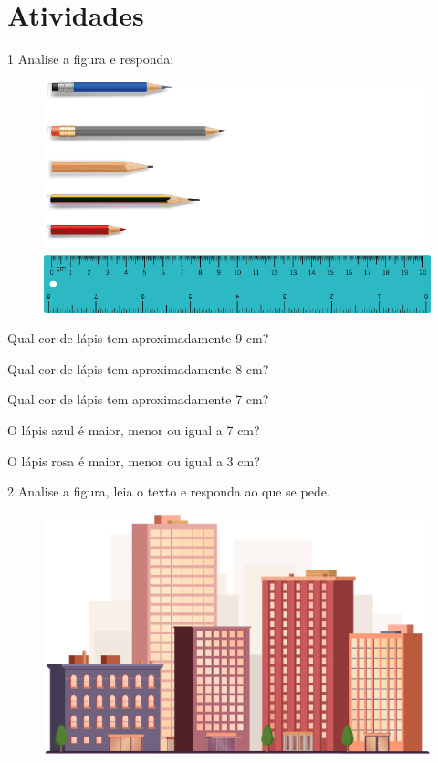 \pagebreak
\section*{Atividades}

\num{1} Analise a figura e responda:

\begin{figure}[htpb!]
\includegraphics[width=.9\textwidth]{./media/image30.png}
\end{figure}

\begin{escolha}[itemsep=-5pt]
\item  Qual cor de lápis tem aproximadamente 9 cm?

\item  Qual cor de lápis tem aproximadamente 8 cm?

\item  Qual cor de lápis tem aproximadamente 7 cm?

\item  O lápis azul é maior, menor ou igual a 7 cm?

\item  O lápis rosa é maior, menor ou igual a 3 cm?
\end{escolha}

\pagebreak
\num{2} Analise a figura, leia o texto e responda ao que se pede.


\begin{figure}[htpb!]
\centering
\includegraphics[width=.6\textwidth]{./media/image31.png}
\end{figure}

